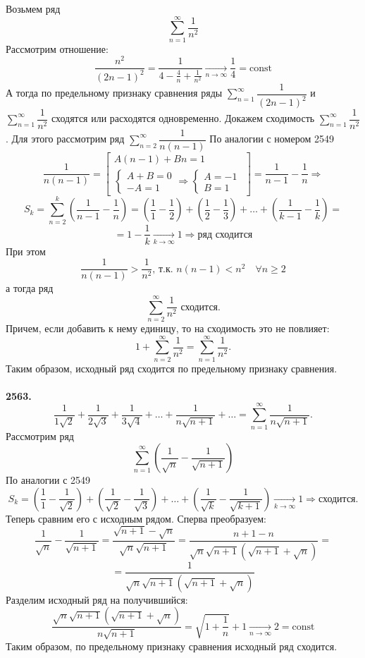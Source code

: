 \documentclass[a4paper, 12pt]{report}
\numberwithin{equation}{section}
\begin{document}
	Возьмем ряд $$ \sum_{n=1}^{\infty} \frac{1}{n^2} $$ 
	Рассмотрим отношение:
	$$ \frac{n^2}{(2n-1)^2} = \frac{1}{4-\frac{4}{n}+\frac{1}{n^2}} \xrightarrow[n \to \infty]{} \frac{1}{4} = \text{const} $$
	А тогда по предельному признаку сравнения ряды $ \sum\limits_{n=1}^{\infty} \dfrac{1}{(2n-1)^2} $ и $ \sum\limits_{n=1}^{\infty} \dfrac{1}{n^2} $ сходятся или расходятся одновременно.
	Докажем сходимость $ \sum\limits_{n=1}^{\infty} \dfrac{1}{n^2} $. Для этого рассмотрим ряд $ \sum\limits_{n=2}^{\infty} \dfrac{1}{n(n-1)} $
	По аналогии с номером 2549
	$$ \frac{1}{n(n-1)} = \left[ \begin{gathered} A(n-1) + Bn = 1 \\ \begin{cases} A+B=0 \\ -A=1 \end{cases} \Rightarrow \begin{cases} A=-1 \\ B=1 \end{cases} \end{gathered} \right] = \frac{1}{n-1} - \frac{1}{n} \Rightarrow $$
	$$ S_k = \sum_{n=2}^{k} \left( \frac{1}{n-1} - \frac{1}{n} \right) = \left( \frac{1}{1} - \frac{1}{2} \right) + \left( \frac{1}{2} - \frac{1}{3} \right) + \dots + \left( \frac{1}{k-1} - \frac{1}{k} \right) = $$
	$$ = 1 - \frac{1}{k} \xrightarrow[k \to \infty]{} 1 \Rightarrow \text{ряд сходится} $$
	При этом
	$$ \frac{1}{n(n-1)} > \frac{1}{n^2} \text{, т.к. } n(n-1) < n^2 \quad \forall n \ge 2 $$
	а тогда ряд
	$$ \sum_{n=2}^{\infty} \frac{1}{n^2} \text{ сходится.} $$
	Причем, если добавить к нему единицу, то на сходимость это не повлияет:
	$$ 1 + \sum_{n=2}^{\infty} \frac{1}{n^2} = \sum_{n=1}^{\infty} \frac{1}{n^2}.$$
	Таким образом, исходный ряд сходится по предельному признаку сравнения.
	\\\\
	\textbf{2563.}
	$$ \frac{1}{1\sqrt{2}} + \frac{1}{2\sqrt{3}} + \frac{1}{3\sqrt{4}} + \dots + \frac{1}{n\sqrt{n+1}} + \dots = \sum_{n=1}^{\infty} \frac{1}{n\sqrt{n+1}}.$$
	Рассмотрим ряд
	$$ \sum_{n=1}^{\infty} \left( \frac{1}{\sqrt{n}} - \frac{1}{\sqrt{n+1}} \right) $$
	По аналогии с 2549
	$$ S_k = \left(\frac{1}{1} - \frac{1}{\sqrt{2}}\right) + \left(\frac{1}{\sqrt{2}} - \frac{1}{\sqrt{3}}\right) + \dots + \left(\frac{1}{\sqrt{k}} - \frac{1}{\sqrt{k+1}}\right) \xrightarrow[k \to \infty]{} 1 \Rightarrow \text{сходится.} $$
	Теперь сравним его с исходным рядом.
	Сперва преобразуем:
	$$ \frac{1}{\sqrt{n}} - \frac{1}{\sqrt{n+1}} = \frac{\sqrt{n+1}-\sqrt{n}}{\sqrt{n}\sqrt{n+1}} = \frac{n+1-n}{\sqrt{n}\sqrt{n+1}(\sqrt{n+1}+\sqrt{n})} = $$
	$$ = \frac{1}{\sqrt{n}\sqrt{n+1}(\sqrt{n+1}+\sqrt{n})} $$
	Разделим исходный ряд на получившийся:
	$$ \frac{\sqrt{n}\sqrt{n+1}(\sqrt{n+1}+\sqrt{n})}{n\sqrt{n+1}} = \sqrt{1+\frac{1}{n}} + 1 \xrightarrow[n \to \infty]{} 2 = \text{const} $$
	Таким образом, по предельному признаку сравнения исходный ряд сходится.
\end{document}
